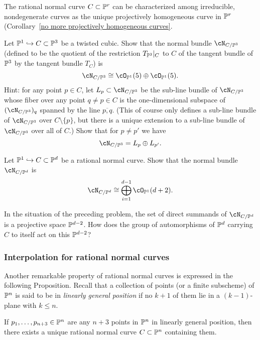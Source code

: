The rational normal curve $C \subset \PP^r$ can  be characterized among irreducible, nondegenerate curves as the unique projectively homogeneous curve in $\PP^r$ (Corollary~\ref{no more projectively homogeneous curves}.

\begin{exercise}
Let $\PP^1 \hookrightarrow C \subset \PP^3$ be a twisted cubic. Show that the normal bundle $\cN_{C/\PP^3}$ (defined to be the quotient of the restriction $T_{\PP^3}|_C$ to $C$ of the tangent bundle  of $\PP^3$  by the tangent bundle $T_C$) is 
$$
\cN_{C/\PP^3} \cong \cO_{\PP^1}(5) \oplus  \cO_{\PP^1}(5).
$$
Hint: for any point $p \in C$, let $L_p \subset \cN_{C/\PP^3}$ be the sub-line bundle of $\cN_{C/\PP^3}$ whose fiber over any point $q \neq p \in C$ is the one-dimensional subspace of $(\cN_{C/\PP^3})_q$ spanned by the line $\overline{p,q}$. (This of course only defines a sub-line bundle of $\cN_{C/\PP^3}$ over $C \setminus \{p\}$, but there is a unique extension to a sub-line bundle of $\cN_{C/\PP^3}$ over all of $C$.) Show that for $p \neq p'$ we have
$$
\cN_{C/\PP^3} = L_p \oplus L_{p'}.
$$
\end{exercise}

\begin{exercise}
Let $\PP^1 \hookrightarrow C \subset \PP^d$ be a rational normal curve. Show that the normal bundle $\cN_{C/\PP^d}$  is 
$$
\cN_{C/\PP^d} \cong \bigoplus_{i=1}^{d-1} \cO_{\PP^1}(d+2).
$$
\end{exercise}

\begin{exercise}
In the situation of the preceding problem, the set  of direct summands of $\cN_{C/\PP^d} $ is a projective space $\PP^{d-2}$. How does the  group of automorphisms of $\PP^d$ carrying $C$ to itself act on this $\PP^{d-2}$?

\end{exercise}

\subsubsection{Interpolation for rational normal curves}

Another remarkable property of rational normal curves is expressed in the following Proposition. Recall that a collection of points (or a finite subscheme)
of $\PP^n$ is said to be in \emph{linearly general position} if no $k+1$ of them lie in a $(k-1)$-plane with $k\leq n$. 

\begin{proposition}\label{points on rnc}
If $p_1,\dots, p_{n+3} \in \PP^n$ are any $n+3$ points in $\PP^n$ in linearly general position, then there exists a unique rational normal curve $C \subset \PP^n$ containing them.
 \end{proposition}

